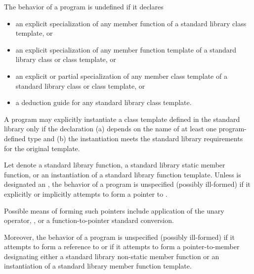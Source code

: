 \pnum
The behavior of a \Cpp{} program is undefined if it declares
\begin{itemize}
\item an explicit specialization of any member function of a standard
library class template, or

\item an explicit specialization of any member function template of a
standard library class or class template, or

\item an explicit or partial specialization of any member class template
of a standard library class or class template, or

\item a deduction guide for any standard library class template.
\end{itemize}

\pnum
A program may explicitly instantiate
a class template defined in the standard library
only if the declaration
(a) depends on the name of at least one program-defined type
and
(b) the instantiation meets the standard library requirements for the
original template.

\pnum
Let  denote
a standard library function,
a standard library static member function,
or an instantiation
of a standard library function template.
Unless  is designated
an ,
the behavior of a \Cpp{} program is unspecified (possibly ill-formed)
if it explicitly or implicitly attempts
to form a pointer
to .
\begin{note}
Possible means of forming such pointers include
application of the unary \tcode{\&} operator,
,
or
a function-to-pointer standard conversion.
\end{note}
Moreover,
the behavior of a \Cpp{} program is unspecified (possibly ill-formed)
if it attempts to form a reference
to 
or
if it attempts to form a pointer-to-member designating
either a standard library non-static member function
or an instantiation of a standard library member function template.


